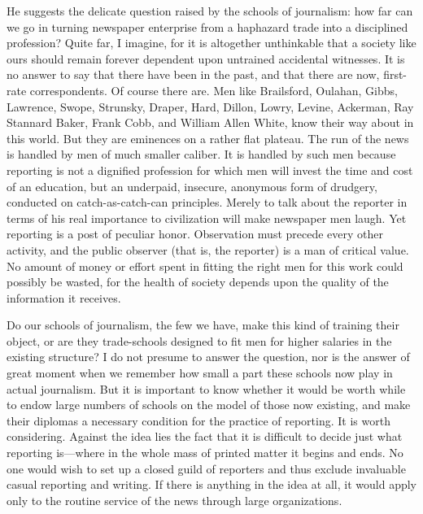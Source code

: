 \documentclass[openany,nobib,twoside,nohyper]{tufte-book}
\begin{document}
He suggests the delicate question raised by the schools of journalism:
how far can we go in turning newspaper enterprise from a haphazard trade
into a disciplined profession? Quite far, I imagine, for it is
altogether unthinkable that a society like ours should remain forever
dependent upon untrained accidental witnesses. It is no answer to say
that there have been in the past, and that there are now, first-rate
correspondents. Of course there are. Men like Brailsford, Oulahan,
Gibbs, Lawrence, Swope, Strunsky, Draper, Hard, Dillon, Lowry, Levine,
Ackerman, Ray Stannard Baker, Frank Cobb, and William Allen White, know
their way about in this world. But they are eminences on a rather flat
plateau. The run of the news is handled by men of much smaller caliber.
It is handled by such men because reporting is not a dignified
profession for which men will invest the time and cost of an education,
but an underpaid, insecure, anonymous form of drudgery, conducted on
catch-as-catch-can principles. Merely to talk about the reporter in
terms of his real importance to civilization will make newspaper men
laugh. Yet reporting is a post of peculiar honor. Observation must
precede every other activity, and the public observer (that is, the
reporter) is a man of critical value. No amount of money or effort spent
in fitting the right men for this work could possibly be wasted, for the
health of society depends upon the quality of the information it
receives.

Do our schools of journalism, the few we have, make this kind of
training their object, or are they trade-schools designed to fit men for
higher salaries in the existing structure? I do not presume to answer
the question, nor is the answer of great moment when we remember how
small a part these schools now play in actual journalism. But it is
important to know whether it would be worth while to endow large numbers
of schools on the model of those now existing, and make their diplomas a
necessary condition for the practice of reporting. It is worth
considering. Against the idea lies the fact that it is difficult to
decide just what reporting is---where in the whole mass of printed
matter it begins and ends. No one would wish to set up a closed guild of
reporters and thus exclude invaluable casual reporting and writing. If
there is anything in the idea at all, it would apply only to the routine
service of the news through large organizations.
\end{document}
